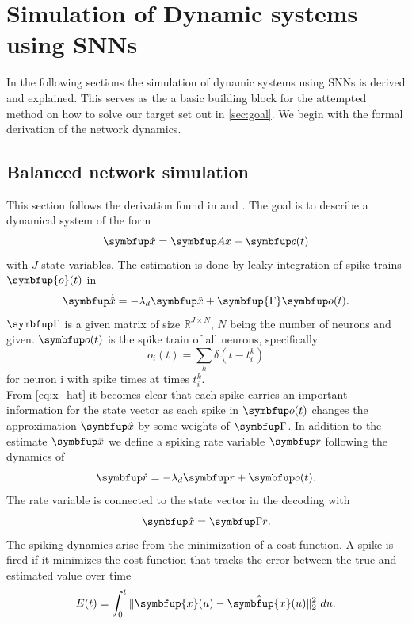 \section{Simulation of Dynamic systems using \acp{SNN}}\label{sec:simulation}
In the following sections the simulation of dynamic systems using \acp{SNN} is derived and explained. This serves as the a basic building block for the attempted method on how to solve our target set out in \cref{sec:goal}. We begin with the formal derivation of the network dynamics.

\subsection{Balanced network simulation}\label{ssec:balanced_network_sim}
This section follows the derivation found in \cite{boerlin_predictive_2013} and \cite{huang_dynamics_2019}.
The goal is to describe a dynamical system of the form
\begin{equation}\label{eq:x}
\bmu{\dot{x}} = \bmu{Ax} + \bmu{c}(t)
\end{equation}
with $J$ state variables.
The estimation is done by leaky integration of spike trains $\symbfup{o}(t)$ in
\begin{equation}\label{eq:x_hat}
\bmu{\dot{\hat{x}}} = -\lambda_d \bmu{\hat{x}} + \symbfup{\Gamma} \bmu{o}(t).
\end{equation}
$\bmu{\Gamma}$ is a given matrix of size $\mathbb{R}^{J\times N}$, $N$ being the number of neurons and given. $\bmu{o}(t)$ is the spike train of all neurons, specifically
\begin{equation}
	o_i(t) = \sum_k \delta(t - t^k_i)
\end{equation}
for neuron i with spike times at times $t_i^k$.\\
From \cref{eq:x_hat} it becomes clear that each spike carries an important information for the state vector as each spike in $\bmu{o}(t)$ changes the approximation $\bmu{\hat{x}}$ by some weights of $\bmu{\Gamma}$.
In addition to the estimate $\bmu{\hat{x}}$ we define a spiking rate variable $\bmu{r}$ following the dynamics of
\begin{equation}\label{eq:rate}
\bmu{\dot{r}} = -\lambda_d\bmu{r} + \bmu{o}(t).
\end{equation}
The rate variable is connected to the state vector in the decoding with
\begin{equation}\label{eq:decoding}
	\bmu{\hat{x}} = \bmu{\Gamma r}.
\end{equation}
The spiking dynamics arise from the minimization of a cost function. A spike is fired if it minimizes the cost function that tracks the error between the true and estimated value over time
\begin{equation}\label{eq:cost_func_basic}
E(t)=\int_0^t \|\symbfup{x}(u)-\hat{\symbfup{x}}(u)\|_2^2 \ du.
\end{equation}


